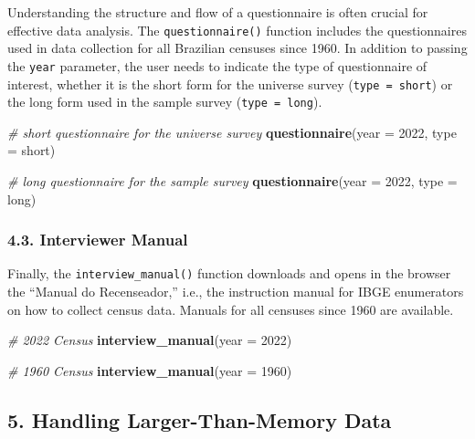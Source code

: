 \documentclass[
]{article}
\newenvironment{Shaded}{\begin{snugshade}}{\end{snugshade}}
\newcommand{\AttributeTok}[1]{\textcolor[rgb]{0.13,0.29,0.53}{#1}}
\newcommand{\CommentTok}[1]{\textcolor[rgb]{0.56,0.35,0.01}{\textit{#1}}}
\newcommand{\DecValTok}[1]{\textcolor[rgb]{0.00,0.00,0.81}{#1}}
\newcommand{\FunctionTok}[1]{\textcolor[rgb]{0.13,0.29,0.53}{\textbf{#1}}}
\newcommand{\NormalTok}[1]{#1}
\newcommand{\StringTok}[1]{\textcolor[rgb]{0.31,0.60,0.02}{#1}}
\begin{document}
Understanding the structure and flow of a questionnaire is often crucial
for effective data analysis. The \texttt{questionnaire()} function
includes the questionnaires used in data collection for all Brazilian
censuses since 1960. In addition to passing the \texttt{year} parameter,
the user needs to indicate the type of questionnaire of interest,
whether it is the short form for the universe survey
(\texttt{type\ =\ \textquotesingle{}short\textquotesingle{}}) or the
long form used in the sample survey
(\texttt{type\ =\ \textquotesingle{}long\textquotesingle{}}).

\begin{Shaded}
\begin{Highlighting}[]
\CommentTok{\# short questionnaire for the universe survey}
\FunctionTok{questionnaire}\NormalTok{(}\AttributeTok{year =} \DecValTok{2022}\NormalTok{, }
              \AttributeTok{type =} \StringTok{\textquotesingle{}short\textquotesingle{}}\NormalTok{)}

\CommentTok{\# long questionnaire for the sample survey}
\FunctionTok{questionnaire}\NormalTok{(}\AttributeTok{year =} \DecValTok{2022}\NormalTok{, }
              \AttributeTok{type =} \StringTok{\textquotesingle{}long\textquotesingle{}}\NormalTok{)}
\end{Highlighting}
\end{Shaded}

\subsubsection{4.3. Interviewer Manual}\label{interviewer-manual}

Finally, the \texttt{interview\_manual()} function downloads and opens
in the browser the ``Manual do Recenseador,'' i.e., the instruction
manual for IBGE enumerators on how to collect census data. Manuals for
all censuses since 1960 are available.

\begin{Shaded}
\begin{Highlighting}[]
\CommentTok{\# 2022 Census}
\FunctionTok{interview\_manual}\NormalTok{(}\AttributeTok{year =} \DecValTok{2022}\NormalTok{)}

\CommentTok{\# 1960 Census}
\FunctionTok{interview\_manual}\NormalTok{(}\AttributeTok{year =} \DecValTok{1960}\NormalTok{)}
\end{Highlighting}
\end{Shaded}

\subsection{5. Handling Larger-Than-Memory
Data}\label{handling-larger-than-memory-data}
\end{document}
